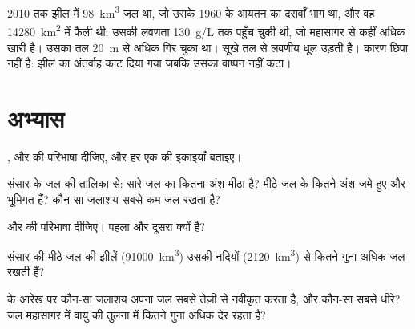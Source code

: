 2010 तक झील में \qty{98}{km^3} जल था, जो उसके 1960 के आयतन का दसवाँ भाग था, और वह
\qty{14280}{km^2} में फैली थी; उसकी लवणता \qty{130}{g/L} तक पहुँच चुकी थी, जो महासागर से
कहीं अधिक खारी है। उसका तल \qty{20}{m} से अधिक गिर चुका था। सूखे तल से लवणीय धूल
उड़ती है। कारण छिपा नहीं है: झील का अंतर्वाह काट दिया गया
जबकि उसका वाष्पन नहीं कटा।

\section{अभ्यास}

\begin{exercise}[$\star$]\label{exo:g10:freshwater-resources:1}
,  और  की परिभाषा दीजिए, और हर एक की इकाइयाँ बताइए।
\end{exercise}

\begin{exercise}[$\star$]\label{exo:g10:freshwater-resources:2}
संसार के जल की तालिका से: सारे जल का कितना अंश मीठा है? मीठे
जल के कितने अंश जमे हुए और भूमिगत हैं? कौन-सा जलाशय सबसे
कम जल रखता है?
\end{exercise}

\begin{exercise}[$\star$]\label{exo:g10:freshwater-resources:3}
 और  की परिभाषा दीजिए। पहला 
और दूसरा  क्यों है?
\end{exercise}

\begin{exercise}[$\star$]\label{exo:g10:freshwater-resources:4}
संसार की मीठे जल की झीलें (\num{91000}~\unit{km^3}) उसकी नदियों (\num{2120}~\unit{km^3})
से कितने गुना अधिक जल रखती हैं?
\end{exercise}

\begin{exercise}[$\star$]\label{exo:g10:freshwater-resources:5}
 के आरेख पर कौन-सा जलाशय अपना जल सबसे तेज़ी से नवीकृत करता है,
और कौन-सा सबसे धीरे? जल महासागर में वायु की तुलना में कितने गुना अधिक देर
रहता है?
\end{exercise}

